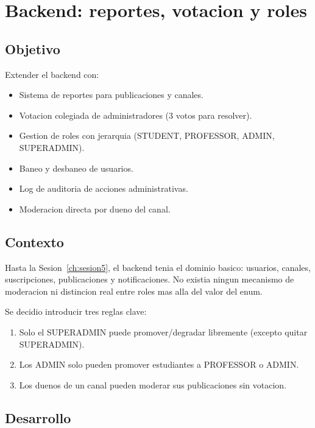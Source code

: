 \chapter{Backend: reportes, votacion y roles}
\label{ch:backend_reportes}

\section{Objetivo}

Extender el backend con:

\begin{itemize}[leftmargin=*]
  \item Sistema de reportes para publicaciones y canales.
  \item Votacion colegiada de administradores (3 votos para resolver).
  \item Gestion de roles con jerarquia (STUDENT, PROFESSOR, ADMIN, SUPERADMIN).
  \item Baneo y desbaneo de usuarios.
  \item Log de auditoria de acciones administrativas.
  \item Moderacion directa por dueno del canal.
\end{itemize}

\section{Contexto}

Hasta la Sesion~\ref{ch:sesion5}, el backend tenia el dominio basico: usuarios, canales, suscripciones, publicaciones y notificaciones. No existia ningun mecanismo de moderacion ni distincion real entre roles mas alla del valor del enum.

Se decidio introducir tres reglas clave:

\begin{enumerate}[leftmargin=*]
  \item Solo el SUPERADMIN puede promover/degradar libremente (excepto quitar SUPERADMIN).
  \item Los ADMIN solo pueden promover estudiantes a PROFESSOR o ADMIN.
  \item Los duenos de un canal pueden moderar sus publicaciones sin votacion.
\end{enumerate}

\section{Desarrollo}

